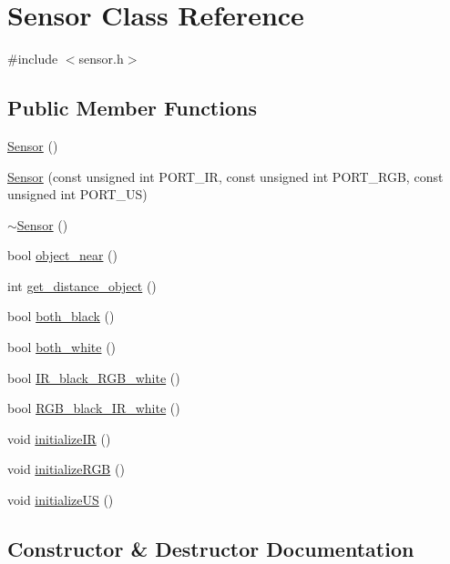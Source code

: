 \hypertarget{class_sensor}{}\section{Sensor Class Reference}
\label{class_sensor}


{\ttfamily \#include $<$sensor.\+h$>$}

\subsection*{Public Member Functions}
\begin{DoxyCompactItemize}
\item 
\mbox{\hyperlink{class_sensor_a342d6d11ef572c8cba92cb76fb1a294b}{Sensor}} ()
\item 
\mbox{\hyperlink{class_sensor_a47122c90fb62cd4510af51161058953d}{Sensor}} (const unsigned int P\+O\+R\+T\+\_\+\+IR, const unsigned int P\+O\+R\+T\+\_\+\+R\+GB, const unsigned int P\+O\+R\+T\+\_\+\+US)
\item 
\mbox{\hyperlink{class_sensor_aee8c70e7ef05ce65e7ee33686b5d7db2}{$\sim$\+Sensor}} ()
\item 
bool \mbox{\hyperlink{class_sensor_a4f797e3f6a549cfdefab639eb6a86787}{object\+\_\+near}} ()
\item 
int \mbox{\hyperlink{class_sensor_a118f38dcb8a695ad78b7c7d94f508d4f}{get\+\_\+distance\+\_\+object}} ()
\item 
bool \mbox{\hyperlink{class_sensor_a32ebdbb3ba6fbe19739a10b17dc11cba}{both\+\_\+black}} ()
\item 
bool \mbox{\hyperlink{class_sensor_add2279da6d407ed7678064ab1fe7d02d}{both\+\_\+white}} ()
\item 
bool \mbox{\hyperlink{class_sensor_a03b8f6886c672badadfeef89d069e1ea}{I\+R\+\_\+black\+\_\+\+R\+G\+B\+\_\+white}} ()
\item 
bool \mbox{\hyperlink{class_sensor_aa75ec0ed5bd2782f726f7e01796b2285}{R\+G\+B\+\_\+black\+\_\+\+I\+R\+\_\+white}} ()
\item 
void \mbox{\hyperlink{class_sensor_a7065fe2dff6107b89d162e59271a9491}{initialize\+IR}} ()
\item 
void \mbox{\hyperlink{class_sensor_a1684cc490c5dd360890d2c0cdfd23fd3}{initialize\+R\+GB}} ()
\item 
void \mbox{\hyperlink{class_sensor_a77a538443f5e024bbd144cc56eed3319}{initialize\+US}} ()
\end{DoxyCompactItemize}


\subsection{Constructor \& Destructor Documentation}
\mbox{\label{class_sensor_a342d6d11ef572c8cba92cb76fb1a294b}} 
